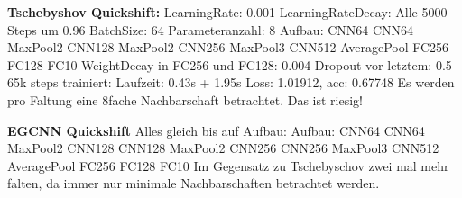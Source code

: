 

\textbf{Tschebyshov Quickshift:}
LearningRate: 0.001
LearningRateDecay: Alle 5000 Steps um 0.96
BatchSize: 64
Parameteranzahl: 8
Aufbau: CNN64 CNN64 MaxPool2 CNN128 MaxPool2 CNN256 MaxPool3 CNN512 AveragePool FC256 FC128 FC10
WeightDecay in FC256 und FC128: 0.004
Dropout vor letztem: 0.5
65k steps trainiert:
Laufzeit: 0.43s + 1.95s
Loss: 1.01912, acc: 0.67748
Es werden pro Faltung eine 8fache Nachbarschaft betrachtet.
Das ist riesig!

\textbf{EGCNN Quickshift}
Alles gleich bis auf Aufbau:
Aufbau: CNN64 CNN64 MaxPool2 CNN128 CNN128 MaxPool2 CNN256 CNN256 MaxPool3 CNN512 AveragePool FC256 FC128 FC10
Im Gegensatz zu Tschebyschov zwei mal mehr falten, da immer nur minimale Nachbarschaften betrachtet werden.
